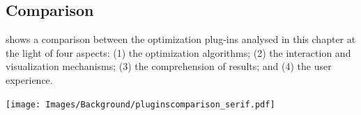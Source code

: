 	
	\subsection{Comparison}
	
	 shows a comparison between the optimization plug-ins analysed in this chapter at the light of four aspects: (1) the optimization algorithms; (2) the interaction and visualization mechanisms; (3) the comprehension of results; and (4) the user experience.
	
	\begin{table}[h!]	
		\label{table:pluginscompare}	
		\centering
		\caption[Comparison between the analysed optimization plug-ins]{Comparison between the analysed optimization plug-ins. S - single, M - multi, G - Global, L - Local.}

		\texttt{[image: Images/Background/pluginscomparison\_serif.pdf]}
	\end{table}
	
